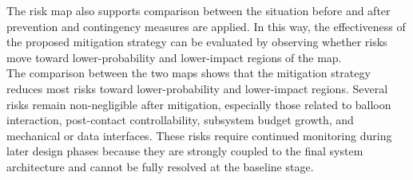The risk map also supports comparison between the situation before and after prevention and contingency measures are applied. In this way, the effectiveness of the proposed mitigation strategy can be evaluated by observing whether risks move toward lower-probability and lower-impact regions of the map.\\
The comparison between the two maps shows that the mitigation strategy reduces most risks toward lower-probability and lower-impact regions. Several risks remain non-negligible after mitigation, especially those related to balloon interaction, post-contact controllability, subsystem budget growth, and mechanical or data interfaces. These risks require continued monitoring during later design phases because they are strongly coupled to the final system architecture and cannot be fully resolved at the baseline stage.
